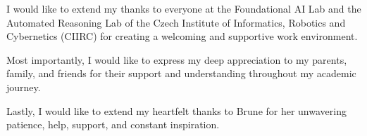 \documentclass[11pt, twoside, openright]{thesis}
\begin{document}
I would like to extend my thanks to everyone at the Foundational AI Lab and the
Automated Reasoning Lab of the Czech Institute of Informatics, Robotics and
Cybernetics (CIIRC) for creating a welcoming and supportive work environment.

Most importantly, I would like to express my deep appreciation to my parents,
family, and friends for their support and understanding throughout my academic
journey.

Lastly, I would like to extend my heartfelt thanks to Brune for her unwavering
patience, help, support, and constant inspiration.

\cleardoublepage
\hypertarget{contents}{}
\tableofcontents

\mainmatter










\setlength{}
\printbibliography
\end{document}
